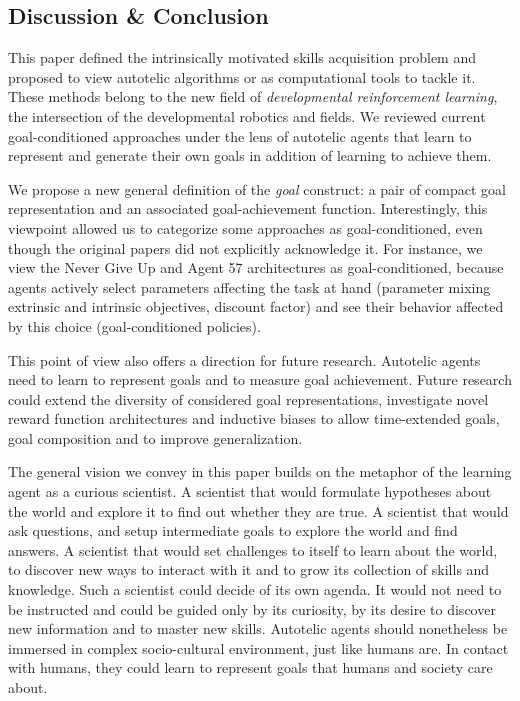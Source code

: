 \subsection{Discussion \& Conclusion}

This paper defined the intrinsically motivated skills acquisition problem and proposed to view autotelic \rl algorithms or \rlimgep as computational tools to tackle it. These methods belong to the new field of \textit{developmental reinforcement learning}, the intersection of the developmental robotics and \rl fields. We reviewed current goal-conditioned \rl approaches under the lens of autotelic agents that learn to represent and generate their own goals in addition of learning to achieve them.

We propose a new general definition of the \textit{goal} construct: a pair of compact goal representation and an associated goal-achievement function. Interestingly, this viewpoint allowed us to categorize some \rl approaches as goal-conditioned, even though the original papers did not explicitly acknowledge it. For instance, we view the Never Give Up \cite{badia2020never} and Agent 57 \cite{badia2020agent57} architectures as goal-conditioned, because agents actively select parameters affecting the task at hand (parameter mixing extrinsic and intrinsic objectives, discount factor) and see their behavior affected by this choice (goal-conditioned policies).

This point of view also offers a direction for future research. Autotelic agents need to learn to represent goals and to measure goal achievement. Future research could extend the diversity of considered goal representations, investigate novel reward function architectures and inductive biases to allow time-extended goals, goal composition and to improve generalization.

The general vision we convey in this paper builds on the metaphor of the learning agent as a curious scientist. A scientist that would formulate hypotheses about the world and explore it to find out whether they are true. A scientist that would ask questions, and setup intermediate goals to explore the world and find answers. A scientist that would set challenges to itself to learn about the world, to discover new ways to interact with it and to grow its collection of skills and knowledge. Such a scientist could decide of its own agenda. It would not need to be instructed and could be guided only by its curiosity, by its desire to discover new information and to master new skills. Autotelic agents should nonetheless be immersed in complex socio-cultural environment, just like humans are. In contact with humans, they could learn to represent goals that humans and society care about. 

